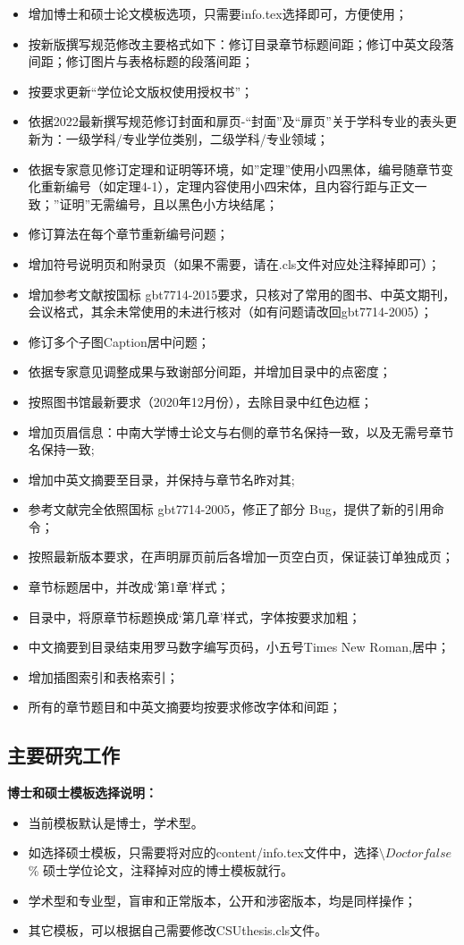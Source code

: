 \begin{itemize}
\item 增加博士和硕士论文模板选项，只需要info.tex选择即可，方便使用；
\item 按新版撰写规范修改主要格式如下：修订目录章节标题间距；修订中英文段落间距；修订图片与表格标题的段落间距；
\item 按要求更新“学位论文版权使用授权书”；
\item 依据2022最新撰写规范修订封面和扉页-“封面”及“扉页”关于学科专业的表头更新为：一级学科/专业学位类别，二级学科/专业领域；
\item 依据专家意见修订定理和证明等环境，如”定理”使用小四黑体，编号随章节变化重新编号（如定理4-1），定理内容使用小四宋体，且内容行距与正文一致；”证明”无需编号，且以黑色小方块结尾；
\item 修订算法在每个章节重新编号问题；
\item 增加符号说明页和附录页（如果不需要，请在.cls文件对应处注释掉即可）；
\item  增加参考文献按国标 gbt7714-2015要求，只核对了常用的图书、中英文期刊，会议格式，其余未常使用的未进行核对（如有问题请改回gbt7714-2005）；
\item  修订多个子图Caption居中问题；
\item 依据专家意见调整成果与致谢部分间距，并增加目录中的点密度；
\item 按照图书馆最新要求（2020年12月份），去除目录中红色边框；
\item 增加页眉信息：中南大学博士论文与右侧的章节名保持一致，以及无需号章节名保持一致;
\item 增加中英文摘要至目录，并保持与章节名昨对其;
\item 参考文献完全依照国标 gbt7714-2005，修正了部分 Bug，提供了新的引用命令；
\item 按照最新版本要求，在声明扉页前后各增加一页空白页，保证装订单独成页；
\item 章节标题居中，并改成‘第1章’样式；
\item 目录中，将原章节标题换成‘第几章’样式，字体按要求加粗；
\item 中文摘要到目录结束用罗马数字编写页码，小五号Times New Roman,居中；
\item 增加插图索引和表格索引；
\item 所有的章节题目和中英文摘要均按要求修改字体和间距；
\end{itemize}

\subsection{主要研究工作}
\textbf{博士和硕士模板选择说明：}
\begin{itemize}
	\item 当前模板默认是博士，学术型。
	\item 如选择硕士模板，只需要将对应的content/info.tex文件中，选择$\setminus Doctorfalse$ \% 硕士学位论文，注释掉对应的博士模板就行。
	\item 学术型和专业型，盲审和正常版本，公开和涉密版本，均是同样操作；
	\item 其它模板，可以根据自己需要修改CSUthesis.cls文件。
\end{itemize}

